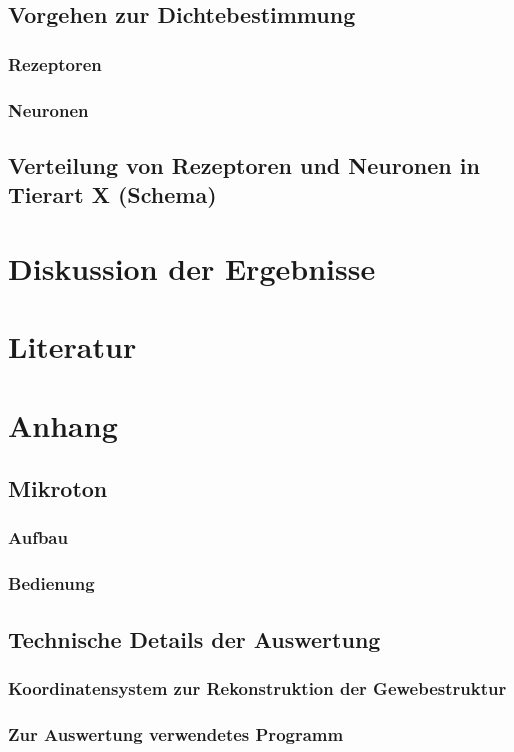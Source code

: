 \documentclass[11pt,a4paper]{scrartcl}
\newcommand{\setpageno}[1]{%
    \setcounter{page}{#1}
    \newpage
}
\begin{document}
\subsection{Vorgehen zur Dichtebestimmung}
\subsubsection{Rezeptoren}
\setpageno{11}
\subsubsection{Neuronen}
\setpageno{13}
\subsection{Verteilung von Rezeptoren und Neuronen in Tierart X (Schema)}
\setpageno{15}

\section{Diskussion der Ergebnisse}
\setpageno{18}

\section{Literatur}
\setpageno{19}

\setcounter{section}{0}
\renewcommand{\thesection}{\Alph{section}}

\section{Anhang}
\subsection{Mikroton}
\subsubsection{Aufbau}
\setpageno{20}

\subsubsection{Bedienung}
\setpageno{24}

\subsection{Technische Details der Auswertung}
\subsubsection{Koordinatensystem zur Rekonstruktion der Gewebestruktur}
\setpageno{28}

\subsubsection{Zur Auswertung verwendetes Programm}
\setpageno{32}
\end{document}
